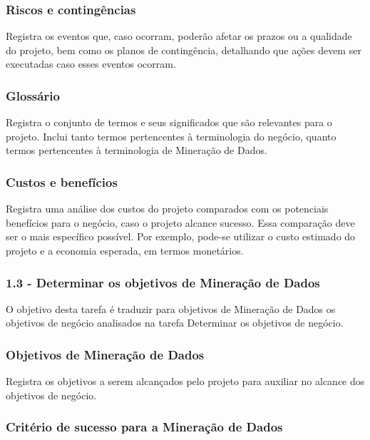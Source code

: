 \subsubsection*{Riscos e contingências}

Registra os eventos que, caso ocorram, poderão afetar os prazos ou a qualidade do projeto, bem como os planos de contingência, detalhando que ações devem ser executadas caso esses eventos ocorram.

\subsubsection*{Glossário}

Registra o conjunto de termos e seus significados que são relevantes para o projeto. Inclui tanto termos pertencentes à terminologia do negócio, quanto termos pertencentes à terminologia de Mineração de Dados.

\subsubsection*{Custos e benefícios}

Registra uma análise dos custos do projeto comparados com os potenciais benefícios para o negócio, caso o projeto alcance sucesso. Essa comparação deve ser o mais específico possível. Por exemplo, pode-se utilizar o custo estimado do projeto e a economia esperada, em termos monetários.

\subsubsection*{\textbf{1.3 - Determinar os objetivos de Mineração de Dados}}

O objetivo desta tarefa é traduzir para objetivos de Mineração de Dados os objetivos de negócio analisados na tarefa Determinar os objetivos de negócio.

\subsubsection*{Objetivos de Mineração de Dados}

Registra os objetivos a serem alcançados pelo projeto para auxiliar no alcance dos objetivos de negócio.

\subsubsection*{Critério de sucesso para a Mineração de Dados}

